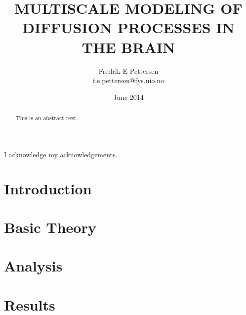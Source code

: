 \documentclass[twoside,english]{uiofysmaster}
\author{Fredrik E Pettersen\\ f.e.pettersen@fys.uio.no}
\title{\uppercase{Multiscale modeling of diffusion processes in the brain}}
\date{June 2014}
\begin{document}
\maketitle

\begin{abstract}
This is an abstract text.
\end{abstract}


\begin{acknowledgements}
  I acknowledge my acknowledgements.
\end{acknowledgements}


\tableofcontents
\clearpage
\listoffigures
\clearpage
\listoftables

\chapter{Introduction}


\chapter{Basic Theory}



\chapter{Analysis}


\chapter{Results}

\printbibliography
\end{document}
